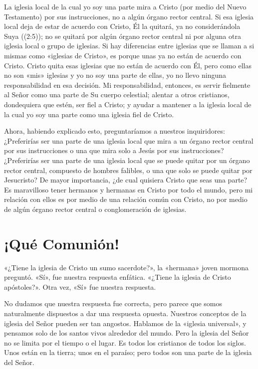 \documentclass[12pt, twoside, openright]{book}
\begin{document}
La iglesia local de la cual yo soy una parte mira a Cristo (por medio del Nuevo Testamento) por sus instrucciones, no a algún órgano rector central. Si esa iglesia local deja de estar de acuerdo con Cristo, Él la quitará, ya no considerándola Suya ((2:5)); no se quitará por algún órgano rector central ni por alguna otra iglesia local o grupo de iglesias. Si hay diferencias entre iglesias que se llaman a si mismas como «iglesias de Cristo», es porque unas ya no están de acuerdo con Cristo. Cristo quita esas iglesias que no están de acuerdo con Él, pero como ellas no son «mis» iglesias y yo no soy una parte de ellas, yo no llevo ninguna responsabilidad en esa decisión. Mi responsabilidad, entonces, es servir fielmente al Señor como una parte de Su cuerpo celestial; alentar a otros cristianos, dondequiera que estén, ser fiel a Cristo; y ayudar a mantener a la iglesia local de la cual yo soy una parte como una iglesia fiel de Cristo.

Ahora, habiendo explicado esto, preguntaríamos a nuestros inquiridores: ¿Preferirías ser una parte de una iglesia local que mira a un órgano rector central por sus instrucciones o una que mira solo a Jesús por sus instrucciones? ¿Preferirías ser una parte de una iglesia local que se puede quitar por un órgano rector central, compuesto de hombres falibles, o una que solo se puede quitar por Jesucristo? De mayor importancia, ¿de cual quisiera Cristo que seas una parte? Es maravilloso tener hermanos y hermanas en Cristo por todo el mundo, pero mi relación con ellos es por medio de una relación común con Cristo, no por medio de algún órgano rector central o conglomeración de iglesias.

\section{¡Qué Comunión!}
«¿Tiene la iglesia de Cristo un sumo sacerdote?», la «hermana» joven mormona preguntó. «Sí», fue nuestra respuesta enfática. «¿Tiene la iglesia de Cristo apóstoles?». Otra vez, «Sí» fue nuestra respuesta.

No dudamos que nuestra respuesta fue correcta, pero parece que somos naturalmente dispuestos a dar una respuesta opuesta. Nuestros conceptos de la iglesia del Señor pueden ser tan angostos. Hablamos de la «iglesia universal», y pensamos solo de los santos vivos alrededor del mundo. Pero la iglesia del Señor no se limita por el tiempo o el lugar. Es todos los cristianos de todos los siglos. Unos están en la tierra; unos en el paraíso; pero todos son una parte de la iglesia del Señor.
\end{document}
